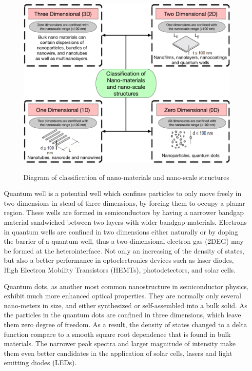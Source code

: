 \begin{figure}
  \caption{Diagram of classification of nano-materials and nano-scale structures}
  \centering
  \includegraphics[width=\textwidth]{pictures/Introduction/Nanomaterials}
  \label{Nanomaterials}
\end{figure}

Quantum well is a potential well which confines particles to only move freely
in two dimensions in stead of three dimensions, by forcing them to occupy a
planar region. These wells are formed in semiconductors by having a narrower
bandgap material sandwiched between two layers with wider bandgap materials.
Electrons in quantum wells are confined in two dimensions either naturally or
by doping the barrier of a quantum well, thus a two-dimensional electron gas
(2DEG) may be formed at the heterointerface. Not only an increasing of the
density of states, but also a better performance in optoelectronics devices such
as laser diodes, High Electron Mobility Transistors (HEMTs), photodetectors,
and solar cells.

Quantum dots, as another most common nanostructure in semiconductor physics,
exhibit much more enhanced optical properties. They are normally only several
nano-meters in size, and either synthesized or self-assembled into a bulk
solid. As the particles in the quantum dots are confined in three dimensions,
which leave them zero degree of freedom. As a result, the density of states
changed to a delta function compare to a smooth square root dependence that is
found in bulk materials. The narrower peak spectra and larger magnitude of
intensity make them even better candidates in the application of solar cells,
lasers and light emitting diodes (LEDs).

